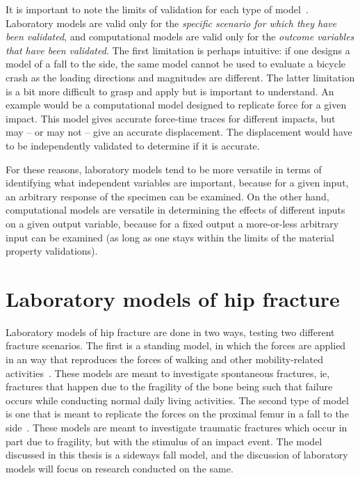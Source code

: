 It is important to note the limits of validation for each type of model~\citep{babuska_verification_2004}.
Laboratory models are valid only for the \textit{specific scenario for which they have been validated}, and computational models are valid only for the \textit{outcome variables that have been validated}.
The first limitation is perhaps intuitive: if one designs a model of a fall to the side, the same model cannot be used to evaluate a bicycle crash as the loading directions and magnitudes are different.
The latter limitation is a bit more difficult to grasp and apply but is important to understand.
An example would be a computational model designed to replicate force for a given impact.
This model gives accurate force-time traces for different impacts, but may -- or may not -- give an accurate displacement.
The displacement would have to be independently validated to determine if it is accurate.

For these reasons, laboratory models tend to be more versatile in terms of identifying what independent variables are important, because for a given input, an arbitrary response of the specimen can be examined.
On the other hand, computational models are versatile in determining the effects of different inputs on a given output variable, because for a fixed output a more-or-less arbitrary input can be examined (as long as one stays within the limits of the material property validations).

\section{Laboratory models of hip fracture}
\label{sec:intro_understanding_modelling_lab}	
Laboratory models of hip fracture are done in two ways, testing two different fracture scenarios.
The first is a standing model, in which the forces are applied in an way that reproduces the forces of walking and other mobility-related activities~\citep{holzer_hip_2009, keyak_relationships_2000, lochmuller_mechanical_2002, juszczyk_human_2011}.
These models are meant to investigate spontaneous fractures, \ac{ie}, fractures that happen due to the fragility of the bone being such that failure occurs while conducting normal daily living activities.
The second type of model is one that is meant to replicate the forces on the proximal femur in a fall to the side~\citep{backman_proximal_1957, beckmann_femoroplasty--augmentation_2007, boehm_prediction_2008, bouxsein_ultrasound_1995, cheng_prediction_1998, cheng_assessment_1997, courtney_age-related_1995, courtney_effects_1994, de_bakker_during_2009, eckstein_reproducibility_2004, ford_effect_1996, heini_femoroplasty-augmentation_2004, keyak_relationships_2000, leichter_optical_2001, lochmuller_mechanical_2002, lotz_use_1990, manske_femoral_2006, manske_cortical_2008, okuizumi_effect_1998, pinilla_impact_1996, pulkkinen_experimental_2008, sutter_biomechanical_2010, turner_biomechanics_2005, weber_proximal_1992}.
These models are meant to investigate traumatic fractures which occur in part due to fragility, but with the stimulus of an impact event.
The model discussed in this thesis is a sideways fall model, and the discussion of laboratory models will focus on research conducted on the same.

